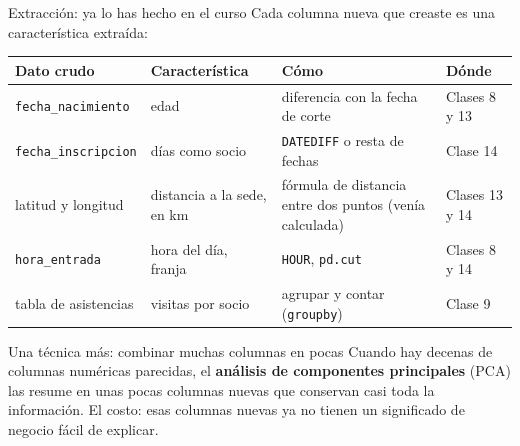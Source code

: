 \documentclass[aspectratio=169,11pt]{beamer}
\begin{document}
\begin{frame}[t]{Extracción: ya lo has hecho en el curso}
  \small
  Cada columna nueva que creaste es una característica extraída:
  \vspace{0.1cm}
  \footnotesize
  \renewcommand{\arraystretch}{1.2}
  \begin{tabular}{@{}L{3.0cm}L{3.2cm}L{4.0cm}L{2.4cm}@{}}
    \toprule
    \textbf{Dato crudo} & \textbf{Característica} & \textbf{Cómo} & \textbf{Dónde} \\
    \midrule
    \texttt{fecha\_nacimiento} & edad & diferencia con la fecha de corte & Clases 8 y 13 \\
    \texttt{fecha\_inscripcion} & días como socio & \texttt{DATEDIFF} o resta de fechas & Clase 14 \\
    latitud y longitud & distancia a la sede, en km & fórmula de distancia entre dos puntos (venía calculada) & Clases 13 y 14 \\
    \texttt{hora\_entrada} & hora del día, franja & \texttt{HOUR}, \texttt{pd.cut} & Clases 8 y 14 \\
    tabla de asistencias & visitas por socio & agrupar y contar (\texttt{groupby}) & Clase 9 \\
    \bottomrule
  \end{tabular}
  \vspace{0.15cm}
  \begin{exampleblock}{Una técnica más: combinar muchas columnas en pocas}
    \footnotesize Cuando hay decenas de columnas numéricas parecidas, el
    \textbf{análisis de componentes principales} (PCA) las resume en unas
    pocas columnas nuevas que conservan casi toda la información. El costo:
    esas columnas nuevas ya no tienen un significado de negocio fácil de
    explicar.
  \end{exampleblock}
\end{frame}
\end{document}
